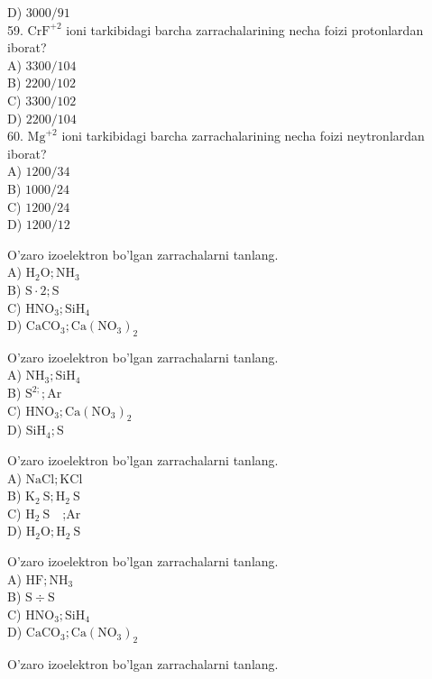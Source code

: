 D) $3000 / 91$\\
59. $\mathrm{CrF}^{+2}$ ioni tarkibidagi barcha zarrachalarining necha foizi protonlardan iborat?\\
A) $3300 / 104$\\
B) $2200 / 102$\\
C) $3300 / 102$\\
D) $2200 / 104$\\
60. $\mathrm{Mg}^{+2}$ ioni tarkibidagi barcha zarrachalarining necha foizi neytronlardan iborat?\\
A) $1200 / 34$\\
B) $1000 / 24$\\
C) $1200 / 24$\\
D) $1200 / 12$
  \item O'zaro izoelektron bo'lgan zarrachalarni tanlang.\\
A) $\mathrm{H}_{2} \mathrm{O} ; \mathrm{NH}_{3}$\\
B) $\mathrm{S} \cdot 2 ; \mathrm{S}$\\
C) $\mathrm{HNO}_{3} ; \mathrm{SiH}_{4}$\\
D) $\mathrm{CaCO}_{3} ; \mathrm{Ca}\left(\mathrm{NO}_{3}\right)_{2}$
  \item O'zaro izoelektron bo'lgan zarrachalarni tanlang.\\
A) $\mathrm{NH}_{3} ; \mathrm{SiH}_{4}$\\
B) $\mathrm{S}^{2 ;} ; \mathrm{Ar}$\\
C) $\mathrm{HNO}_{3} ; \mathrm{Ca}\left(\mathrm{NO}_{3}\right)_{2}$\\
D) $\mathrm{SiH}_{4} ; \mathrm{S}$
  \item O'zaro izoelektron bo'lgan zarrachalarni tanlang.\\
A) $\mathrm{NaCl} ; \mathrm{KCl}$\\
B) $\mathrm{K}_{2} \mathrm{~S} ; \mathrm{H}_{2} \mathrm{~S}$\\
C) $\mathrm{H}_{2} \mathrm{~S} \quad$;Ar\\
D) $\mathrm{H}_{2} \mathrm{O} ; \mathrm{H}_{2} \mathrm{~S}$
  \item O'zaro izoelektron bo'lgan zarrachalarni tanlang.\\
A) $\mathrm{HF} ; \mathrm{NH}_{3}$\\
B) $\mathrm{S} \div \mathrm{S}$\\
C) $\mathrm{HNO}_{3} ; \mathrm{SiH}_{4}$\\
D) $\mathrm{CaCO}_{3} ; \mathrm{Ca}\left(\mathrm{NO}_{3}\right)_{2}$
  \item O'zaro izoelektron bo'lgan zarrachalarni tanlang.\\
